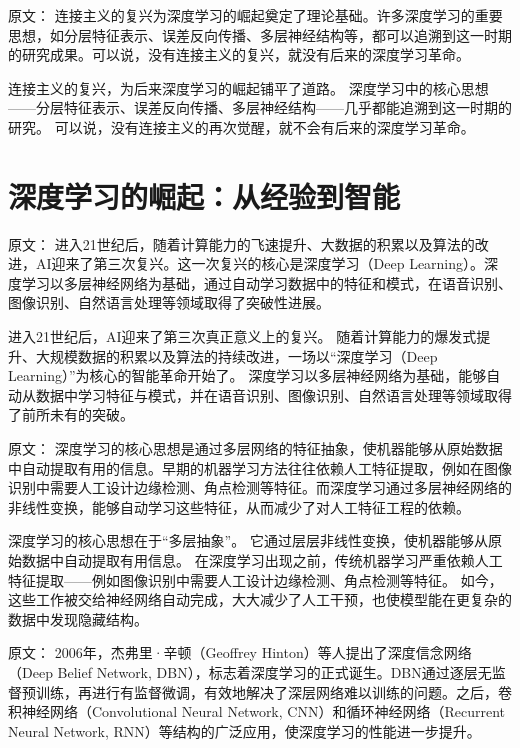 原文：
连接主义的复兴为深度学习的崛起奠定了理论基础。许多深度学习的重要思想，如分层特征表示、误差反向传播、多层神经结构等，都可以追溯到这一时期的研究成果。可以说，没有连接主义的复兴，就没有后来的深度学习革命。

连接主义的复兴，为后来深度学习的崛起铺平了道路。  
深度学习中的核心思想——分层特征表示、误差反向传播、多层神经结构——几乎都能追溯到这一时期的研究。  
可以说，没有连接主义的再次觉醒，就不会有后来的深度学习革命。

\section{深度学习的崛起：从经验到智能}

原文：
进入21世纪后，随着计算能力的飞速提升、大数据的积累以及算法的改进，AI迎来了第三次复兴。这一次复兴的核心是深度学习（Deep Learning）。深度学习以多层神经网络为基础，通过自动学习数据中的特征和模式，在语音识别、图像识别、自然语言处理等领域取得了突破性进展。

进入21世纪后，AI迎来了第三次真正意义上的复兴。  
随着计算能力的爆发式提升、大规模数据的积累以及算法的持续改进，一场以“深度学习（Deep Learning）”为核心的智能革命开始了。  
深度学习以多层神经网络为基础，能够自动从数据中学习特征与模式，并在语音识别、图像识别、自然语言处理等领域取得了前所未有的突破。

原文：
深度学习的核心思想是通过多层网络的特征抽象，使机器能够从原始数据中自动提取有用的信息。早期的机器学习方法往往依赖人工特征提取，例如在图像识别中需要人工设计边缘检测、角点检测等特征。而深度学习通过多层神经网络的非线性变换，能够自动学习这些特征，从而减少了对人工特征工程的依赖。

深度学习的核心思想在于“多层抽象”。  
它通过层层非线性变换，使机器能够从原始数据中自动提取有用信息。  
在深度学习出现之前，传统机器学习严重依赖人工特征提取——例如图像识别中需要人工设计边缘检测、角点检测等特征。  
如今，这些工作被交给神经网络自动完成，大大减少了人工干预，也使模型能在更复杂的数据中发现隐藏结构。

原文：
2006年，杰弗里·辛顿（Geoffrey Hinton）等人提出了深度信念网络（Deep Belief Network, DBN），标志着深度学习的正式诞生。DBN通过逐层无监督预训练，再进行有监督微调，有效地解决了深层网络难以训练的问题。之后，卷积神经网络（Convolutional Neural Network, CNN）和循环神经网络（Recurrent Neural Network, RNN）等结构的广泛应用，使深度学习的性能进一步提升。

